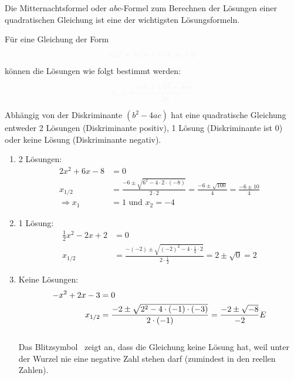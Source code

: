 Die Mitternachtsformel oder \(abc\)-Formel zum Berechnen der Lösungen einer quadratischen Gleichung ist eine der wichtigsten Lösungsformeln.
\begin{tcolorbox}
	Für eine Gleichung der Form
	\begin{align*}
		\textcolor{loestc}{ax^2+bx+c=0,\ a\neq 0}
	\end{align*}
	können die Lösungen wie folgt bestimmt werden:
	\begin{align*}
		\textcolor{loestc}{x_{1/2}=\frac{-b\pm \sqrt{b^2-4ac}}{2a}}
	\end{align*}
\end{tcolorbox}
Abhängig von der Diskriminante \(\left( b^2-4ac\right) \) hat eine quadratische Gleichung entweder 2 Lösungen (Diskriminante positiv), 1 Lösung (Diskriminante ist 0) oder keine Lösung (Diskriminante negativ).
\begin{bsp}\phantom{1}
	\begin{enumerate}[label=\arabic*)]
		\item 2 Lösungen:
		\begin{align*}
			2x^2+6x-8&=0\\
			x_{1/2}&=\frac{-6\pm \sqrt{6^2-4\cdot2\cdot(-8)}}{2\cdot2}=\frac{-6\pm \sqrt{100}}{4}=\frac{-6\pm 10}{4}\\
			\Rightarrow x_1&=1 \text{ und } x_2=-4
		\end{align*}
		\item 1 Lösung:
		\begin{align*}
			\frac{1}{2}x^2-2x+2&=0\\
			x_{1/2}&=\frac{-(-2)\pm \sqrt{(-2)^2-4\cdot\frac{1}{2}\cdot2}}{2\cdot\frac{1}{2}}=2\pm\sqrt{0}=2
		\end{align*}
		\item Keine Lösungen:
		\begin{align*}
			-x^2+2x-3&=0\\
			x_{1/2}&=\frac{-2\pm \sqrt{2^2-4\cdot(-1)\cdot(-3)}}{2\cdot(-1)}=\frac{-2\pm\sqrt{-8}}{-2}\Lightning
		\end{align*}\\
		Das Blitzsymbol {\Lightning}\ zeigt an, dass die Gleichung keine Lösung hat, weil unter der Wurzel nie eine negative Zahl stehen darf (zumindest in den reellen Zahlen).
	\end{enumerate}
\end{bsp}
\newpage
